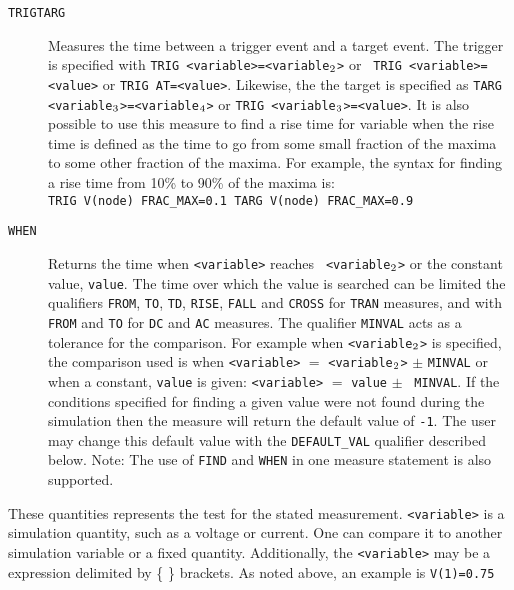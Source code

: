 \begin{Command}
\begin{Arguments}
\begin{description}
  \item[\vbox{\hbox{\tt TRIG\hfil}\hbox{\tt TARG\hfil}}] Measures the
    time between a trigger event and a target event.  The trigger is
    specified with {\tt TRIG <variable>=<variable\(\sb{2}\)>} or {\tt
    TRIG <variable>=<value>} or {\tt TRIG AT=<value>}.  Likewise, the
    the target is specified as {\tt TARG
    <variable\(\sb{3}\)>=<variable\(\sb{4}\)>} or {\tt TRIG
    <variable\(\sb{3}\)>=<value>}.  It is also possible to use this
    measure to find a rise time for variable when the rise time is
    defined as the time to go from some small fraction of the maxima
    to some other fraction of the maxima.  For example, the syntax for
    finding a rise time from 10\% to 90\% of the maxima
    is:\\ \texttt{TRIG V(node) FRAC\_MAX=0.1 TARG V(node)
    FRAC\_MAX=0.9}

  \item[\tt WHEN] Returns the time when {\tt <variable>} reaches {\tt
    <variable\(\sb{2}\)>} or the constant value, {\tt value}.  The
    time over which the value is searched can be limited the qualifiers
    {\tt FROM}, {\tt TO}, {\tt TD}, {\tt RISE}, {\tt FALL} and {\tt CROSS}
    for {\tt TRAN} measures, and with {\tt FROM} and {\tt TO} for {\tt DC}
    and {\tt AC} measures. The qualifier {\tt MINVAL} acts as a tolerance
    for the comparison.  For example when {\tt <variable\(\sb{2}\)>}
    is specified, the comparison used is when {\tt <variable>} $=$
    {\tt <variable\(\sb{2}\)>} $\pm$ {\tt MINVAL} or when a constant,
    {\tt value} is given: {\tt <variable>} $=$ {\tt value} $\pm$ {\tt
    MINVAL}.  If the conditions specified for finding a given value
    were not found during the simulation then the measure will return
    the default value of {\tt -1}.  The user may change this default
    value with the {\tt DEFAULT\_VAL} qualifier described below.
    Note: The use of {\tt FIND} and {\tt WHEN} in one measure
    statement is also supported.
\end{description}


These quantities represents the test for the stated
measurement.  \texttt{<variable>} is a simulation quantity, such as a
voltage or current.  One can compare it to another simulation variable
or a fixed quantity.  Additionally, the \texttt{<variable>} may be
a \Xyce{} expression delimited by \{ \} brackets.  As noted above, an
example is {\tt V(1)=0.75}


\end{Arguments}
\end{Command}
